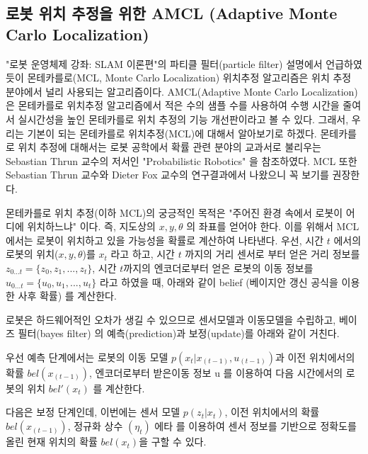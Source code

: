 \subsection{로봇 위치 추정을 위한 AMCL (Adaptive Monte Carlo Localization)}

"로봇 운영체제 강좌: SLAM 이론편"의 파티클 필터(particle filter) 설명에서 언급하였듯이 몬테카를로(MCL, Monte Carlo Localization) 위치추정 알고리즘은 위치 추정 분야에서 널리 사용되는 알고리즘이다. AMCL(Adaptive Monte Carlo Localization) 은 몬테카를로 위치추정 알고리즘에서 적은 수의 샘플 수를 사용하여 수행 시간을 줄여서 실시간성을 높인 몬테카를로 위치 추정의 기능 개선판이라고 볼 수 있다. 그래서, 우리는 기본이 되는 몬테카를로 위치추정(MCL)에 대해서 알아보기로 하겠다. 몬테카를로 위치 추정에 대해서는 로봇 공학에서 확률 관련 분야의 교과서로 불리우는 Sebastian Thrun 교수의 저서인 "Probabilistic Robotics"\cite{thrun2005probabilistic} 을 참조하였다. MCL 또한 Sebastian Thrun 교수와 Dieter Fox 교수의 연구결과\cite{fox1999monte,dellaert1999monte}에서 나왔으니 꼭 보기를 권장한다.

몬테카를로 위치 추정(이하 MCL)의 궁긍적인 목적은 "주어진 환경 속에서 로봇이 어디에 위치하느냐" 이다. 즉, 지도상의 $x, y, \theta$ 의 좌표를 얻어야 한다. 이를 위해서 MCL 에서는 로봇이 위치하고 있을 가능성을 확률로 계산하여 나타낸다. 우선, 시간 $t$ 에서의 로봇의 위치($x, y, \theta$)를  $x_t$ 라고 하고, 시간 $t$ 까지의 거리 센서로 부터 얻은 거리 정보를 $z_{0...t} = \{z_0, z_1, ..., z_t\}$, 시간 $t$까지의 엔코더로부터 얻은 로봇의 이동 정보를 $u_{0...t} = \{u_0, u_1, ..., u_t\}$ 라고 하였을 때, 아래와 같이 belief (베이지안 갱신 공식을 이용한 사후 확률) 를 계산한다.



로봇은 하드웨어적인 오차가 생길 수 있으므로 센서모델과 이동모델을 수립하고, 베이즈 필터(bayes filter) 의  예측(prediction)과 보정(update)를 아래와 같이 거친다. 

우선 예측 단계에서는 로봇의 이동 모델 $p( x_t | x_{(t-1)}, u_{(t-1)} )$과 이전 위치에서의 확률 $bel(x_{(t-1)})$, 엔코더로부터 받은이동 정보 u 를 이용하여 다음 시간에서의 로봇의 위치 $bel'(x_t)$ 를 계산한다.



다음은 보정 단계인데, 이번에는 센서 모델 $p( z_t | x_t )$, 이전 위치에서의 확률 $bel(x_{(t-1)})$, 정규화 상수 $(\eta_t)$ 에타 를 이용하여 센서 정보를 기반으로 정확도를 올린 현재 위치의 확률  $bel(x_t)$을 구할 수 있다.



